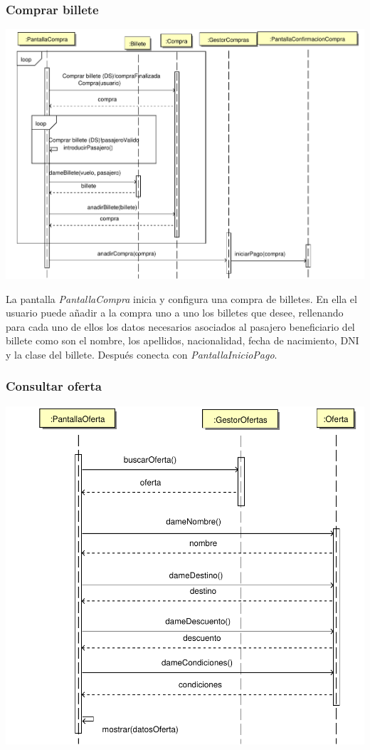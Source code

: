 \documentclass[11pt, a4paper, twoside, titlepage]{article}
\begin{document}
			\subsubsection{Comprar billete}
				\begin{center}
					\includegraphics[scale=.67]{diseno/diagramas/comprarbillete.pdf}
				\end{center}
				La pantalla {\itshape PantallaCompra} inicia y configura una compra de billetes.
				En ella el usuario puede añadir a la compra uno a uno los billetes que desee, rellenando para cada uno de ellos los datos necesarios asociados al pasajero beneficiario del billete como son el nombre, los apellidos, nacionalidad, fecha de nacimiento, DNI y la clase del billete. Después conecta con {\itshape PantallaInicioPago}.
			\subsubsection{Consultar oferta}
				\begin{center}
					\includegraphics[scale=.7]{diseno/diagramas/consultaroferta.pdf}
				\end{center}
\end{document}
